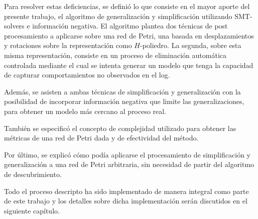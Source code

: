 Para resolver estas deficiencias, se definió lo que consiste en el mayor aporte del presente trabajo, el  algoritmo de
generalización y simplificación utilizando SMT-solvers e información negativa.
El algoritmo plantea dos técnicas de post procesamiento a aplicarse sobre una red de Petri, una basada en 
desplazamientos y rotaciones sobre la representación como $H$-poliedro. La segunda, sobre esta misma representación,
consiste en un proceso de eliminación automática controlada mediante el cual se intenta 
generar un modelo que tenga la capacidad de capturar comportamientos no observados en el log.

Además, se asisten a ambas técnicas de simplificación y generalización con la posibilidad de incorporar
información negativa que limite las generalizaciones, para obtener un modelo más cercano al proceso real.

También se especificó el concepto de complejidad utilizado para obtener las métricas de una red de
Petri dada y de efectividad del método.

Por último, se explicó cómo podía aplicarse el procesamiento de simplificación y generalización a una red de 
Petri arbitraria, sin necesidad de partir del algoritmo de descubrimiento.

Todo el proceso descripto ha sido implementado de manera integral como parte de este trabajo
y los detalles sobre dicha implementación serán discutidos en el siguiente capítulo.

